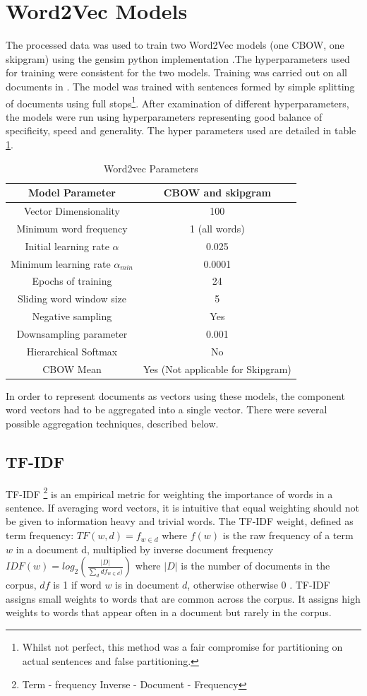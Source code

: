 \section{Word2Vec Models}
The processed data was used to train two Word2Vec models (one CBOW, one skipgram) using the gensim python implementation \cite{gensim}.The hyperparameters used for training were consistent for the two models.
Training was carried out on all documents in . The model was trained with sentences formed by simple splitting of documents using full stops\footnote{Whilst not perfect, this method was a fair compromise for partitioning on actual sentences and false partitioning.}. After examination of different hyperparameters, the models were run using hyperparameters representing good balance of specificity, speed and generality. The hyper parameters used are detailed in table \ref{tab:hyperparams}.
\begin{table}[h!]
\begin{center}
\caption{Word2vec Parameters}
\label{tab:hyperparams}

\begin{tabular}{||c|c||}
\hline
Model Parameter &CBOW and skipgram\\
\hline
Vector Dimensionality & 100\\
Minimum word frequency & 1 (all words)\\
Initial learning rate $\alpha$ & 0.025 \\
Minimum learning rate $\alpha_{min}$&0.0001\\
Epochs of training & 24\\
Sliding word window size & 5\\
Negative sampling & Yes \\
Downsampling parameter & 0.001\\
Hierarchical Softmax & No\\
CBOW Mean & Yes (Not applicable for Skipgram) \\
\hline
\end{tabular}
\end{center}
\end{table}
In order to represent documents as vectors using these models, the component word vectors had to be aggregated into a single vector. There were several possible aggregation techniques, described below.
\subsection{TF-IDF}
TF-IDF \footnote{Term - frequency Inverse - Document - Frequency} is an empirical metric for weighting the importance of words in a sentence. If averaging word vectors, it is intuitive that equal weighting should not be given to information heavy and trivial words. The TF-IDF weight, defined as term frequency: $TF \left( w , d \right) = f_{ w \in d }$ where $f\left( w \right)$ is the raw frequency of a term $w$ in a document d,
multiplied by inverse document frequency $IDF(w) = log_{2} \left( \frac{|D|}{\sum_d df_{w \in d})} \right)$ where $|D|$ is the number of documents in the corpus, $df$ is 1 if word $w$ is in document $d$, otherwise otherwise 0 \cite{gensim}.
TF-IDF assigns small weights to words that are common across the corpus. It assigns high weights to words that appear often in a document but rarely in the corpus.
